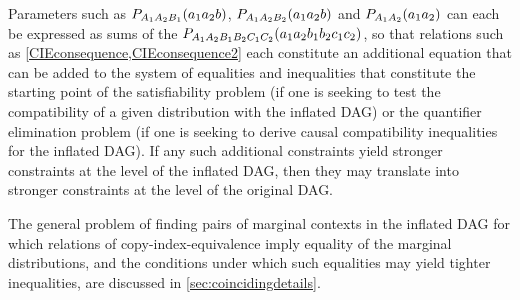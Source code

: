 {%


Parameters such as $\p[A_1 A_2 B_1]{a_1 a_2 b}$, $\p[A_1 A_2 B_2]{a_1 a_2 b}$ and $\p[A_1 A_2]{a_1 a_2}$ can each be expressed as sums of the $\pdf[A_1 A_2 B_1 B_2 C_1 C_2]{a_1 a_2 b_1 b_2 c_1 c_2}$, so that relations such as \cref{CIEconsequence,CIEconsequence2} each constitute an additional equation that can be added to the system of equalities and inequalities that constitute the starting point of the satisfiability problem (if one is seeking to test the compatibility of a given distribution with the inflated DAG) or the quantifier elimination problem (if one is seeking to derive causal compatibility inequalities for the inflated DAG).  If any such additional constraints yield stronger constraints at the level of the inflated DAG, then they may translate into stronger constraints at the level of the original DAG.

The general problem of finding pairs of marginal contexts in the inflated DAG for which relations of copy-index-equivalence imply equality of the marginal distributions, and the conditions under which such equalities may yield tighter inequalities, are discussed in \cref{sec:coincidingdetails}.



}

